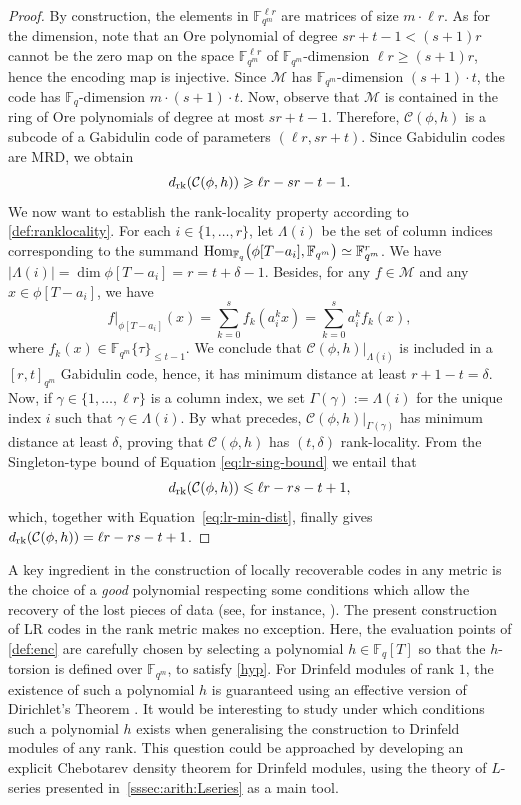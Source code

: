 \documentclass[11pt]{article}
\theoremstyle{definition}
\renewcommand\geq{\geqslant}
\renewcommand\leq{\leqslant}
\newcommand\F{\mathbb{F}}
\newcommand\Fq{\mathbb{F}_q}
\newcommand\Fqm{\F_{q^m}}
\newcommand{\Hom}{\text{\rm Hom}}
\newcommand\rk{\text{\rm rk}}
\begin{document}
\begin{proof}
    By construction, the elements in $\Fqm^{\ell r}$ are matrices of size $m \cdot \ell r$. As for the dimension, note that an Ore polynomial of degree $sr+t-1 < (s+1)r$ cannot be the zero map on the space $\Fqm^{\ell r}$ of $\Fqm$-dimension $\ell r \geq (s+1)r$, hence the encoding map is injective. Since $\mathcal M$  has $\Fqm$-dimension $(s+1)\cdot t$, the code has $\Fq$-dimension $m\cdot (s+1)\cdot t$. Now, observe that $\mathcal M$ is contained in the ring of Ore polynomials of degree at most $sr+t-1$. Therefore, $\mathcal{C}(\phi,h)$ is a subcode of a Gabidulin code of parameters $(\ell r,sr+t)$. Since Gabidulin codes are MRD, we obtain
    \begin{equation}\label{eq:lr-min-dist}
    d_\rk(\mathcal{C}(\phi,h))\geq \ell r-sr-t-1.
    \end{equation} 
    We now want to establish the rank-locality property according to \cref{def:ranklocality}.
    For each $i \in \{1, \ldots, r\}$, let $\Lambda(i)$ be the set of column indices corresponding to the summand $\Hom_{\Fq}\big(\phi[T{-}a_i],\Fqm\big) \simeq \Fqm^r$.
    We have $|\Lambda(i)| = \dim \phi[T{-}a_i] = r = t + \delta - 1$.
    Besides, for any $f\in\mathcal{M}$ and any $x\in \phi[T{-}a_i]$, we have
    \[f|_{\phi[T-a_i]}(x)=\sum_{k=0}^s f_k(a_i^k x)=\sum_{k=0}^s a_i^k f_k(x),\]
    where $f_k(x)\in\Fqm\{\tau\}_{\leq t-1}$. We conclude that $\mathcal{C}(\phi,h)|_{\Lambda(i)}$ is included in a $[r,t]_{q^m}$ Gabidulin code, hence, it has minimum distance at least $r+1-t=\delta$.
    Now, if $\gamma \in \{1, \ldots, \ell r\}$ is a column index, we set $\Gamma(\gamma) := \Lambda(i)$ for the unique index $i$ such that $\gamma \in \Lambda(i)$.
    By what precedes, $\mathcal{C}(\phi,h)|_{\Gamma(\gamma)}$ has minimum distance at least $\delta$, proving that $\mathcal{C}(\phi,h)$ has $(t,\delta)$ rank-locality.
    From the Singleton-type bound of Equation \eqref{eq:lr-sing-bound} we entail that
    \[d_\rk(\mathcal{C}(\phi,h))\leq \ell r - rs-t+1,\]
    which, together with Equation~\eqref{eq:lr-min-dist}, finally gives $d_\rk(\mathcal{C}(\phi,h))= \ell r - rs-t+1$.
\end{proof}

A key ingredient in the construction of locally recoverable codes in any metric is the choice of a \emph{good} polynomial respecting some conditions which allow the recovery of the lost pieces of data (see, for instance, \cite[Section A]{TamoBarg14}). The present construction of LR codes in the rank metric makes no exception. 
Here, the evaluation points of \cref{def:enc} are carefully chosen by selecting a polynomial $h\in\Fq[T]$ so that the $h$-torsion is defined over $\Fqm$, to satisfy \eqref{hyp}. For Drinfeld modules of rank $1$, the existence of such a polynomial $h$ is guaranteed using an effective version of Dirichlet's Theorem \cite[\S~5]{BDM24preprint}. It would be interesting to study under which conditions such a polynomial $h$ exists when generalising the construction to Drinfeld modules of any rank. This question could be approached by developing an explicit Chebotarev density theorem for Drinfeld modules, using the theory of $L$-series presented in~\cref{sssec:arith:Lseries} as a main tool.
\end{document}
